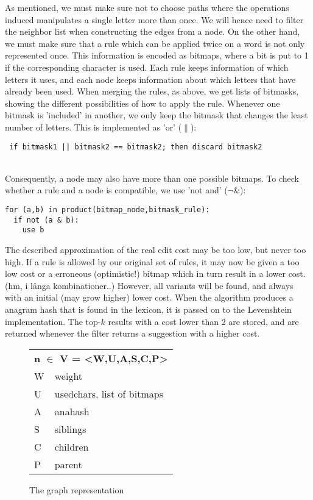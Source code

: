 \documentclass[10pt,a5paper,twoside]{article}
\begin{document}
As mentioned, we must %
make sure not to choose paths where the operations induced manipulates a single
letter more than once. We will hence need to filter the neighbor list when constructing
the edges from a node.
On the other hand, we must make sure
that a rule which can be applied twice on a word is not only represented once.
This information is encoded as bitmaps, where a bit is put to 1 if the
corresponding character is used. Each rule keeps information of which letters
it uses, and each node keeps information about which letters that have already been
used. When merging the rules, as above, we get lists of bitmasks, showing the different
possibilities of how to apply the rule. Whenever one bitmask is 'included' in another,
we only keep the bitmask that changes the least number of letters. This is implemented as
'or' ($\|$): \\ 
\begin{small}\verb- if bitmask1 || bitmask2 == bitmask2; then discard bitmask2 - 
\end{small} \\
Consequently, a node may also have more than one possible bitmaps.
To check whether a rule and a node is compatible, we use 'not and' ($\lnot \&$):
\begin{small}\begin{verbatim}
for (a,b) in product(bitmap_node,bitmask_rule):
  if not (a & b):
    use b 
\end{verbatim} \end{small}
The described approximation of the real edit cost may be too low, but never too
high. If a rule is allowed by our original set of rules, it may now be given a too
low cost or a erroneous (optimistic!) bitmap which in turn result in a lower
cost. (hm, i långa kombinationer..) However, all variants will be found, and always with an
initial (may grow higher) lower cost.
When the algorithm produces a anagram hash that is found in the lexicon, it
is passed on to the Levenshtein implementation. The top-$k$ results with a cost
lower than 2 are stored, and are returned whenever the filter returns a
suggestion with a higher cost.

\begin{figure}
\begin{small}
\begin{tabular}{ll}
\multicolumn{2}{l}{\textbf{n $\in$ V = <W,U,A,S,C,P>}}\\
W   &   weight \\
U   &   usedchars, list of bitmaps \\
A  &    anahash \\
S   &   siblings \\
C   &   children \\
P   &   parent \\
\end{tabular}
\caption{The graph representation} 
\end{small}
\end{figure}
\end{document}

